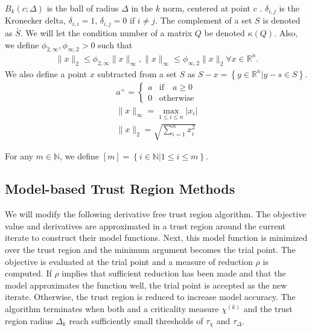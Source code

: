 \documentclass{article}
\theoremstyle{case}
\numberwithin{theorem}{subsection}
\newcommand{\chik}{{\chi^{(k)}}}
\newcommand{\naturals}{\mathbb N}
\newcommand{\Rn}{\mathbb R^n}
\begin{document}
$B_k(c; \Delta)$ is the ball of radius $\Delta$ in the $k$ norm, centered at point $c$ .
$\delta_{i,j}$ is the Kronecker delta, $\delta_{i,i} = 1$, $\delta_{i,j} = 0$ if $i\ne j$.
The complement of a set $S$ is denoted as $\bar S$.
We will let the condition number of a matrix $Q$ be denoted $\kappa(Q)$.
Also, we define $\phi_{2,\infty},\phi_{\infty,2}>0$ such that 
\begin{align}
\|x\|_2 \le \phi_{2, \infty}\|x\|_{\infty}, \|x\|_{\infty} \le \phi_{\infty,2}\|x\|_2\forall x \in \Rn \label{define_norm_changers}.
\end{align}
We also define a point $x$ subtracted from a set $S$ as $S - x = \left\{y \in \Rn | y - s \in S\right\}$.
\begin{align*}
a^+ = \begin{cases} a & \textrm{if} \quad a \ge 0 \\ 0 & \textrm{otherwise} \end{cases}\\
\|x\|_{\infty} = \max_{1\le i\le n}|x_i| \\
\|x\|_{2} = \sqrt{\sum_{i=1}^n x_i^2}
\end{align*}

For any $m \in \naturals$, we define $[m] = \left\{i \in \naturals | 1 \le i \le m\right\}$.

\subsection{Model-based Trust Region Methods}

We will modify the following derivative free trust region algorithm.
The objective value and derivatives are approximated in a trust region around the current iterate to construct their model functions.
Next, this model function is minimized over the trust region and the minimum argument becomes the trial point.
The objective is evaluated at the trial point and a measure of reduction $\rho$ is computed.
If $\rho$ implies that sufficient reduction has been made and that the model approximates the function well, the trial point is accepted as the new iterate.
Otherwise, the trust region is reduced to increase model accuracy.
The algorithm terminates when both and a criticality measure $\chik$ and the trust region radius $\Delta_k$ reach sufficiently small thresholds of $\tau_{\chi}$ and $\tau_{\Delta}$.
\end{document}
